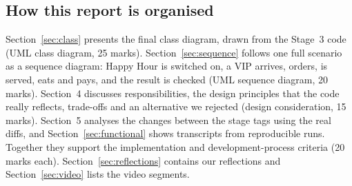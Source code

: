 \subsection*{How this report is organised}

Section~\ref{sec:class} presents the final class diagram, drawn from the Stage~3 code (UML class diagram, 25 marks). Section~\ref{sec:sequence} follows one full scenario as a sequence diagram: Happy Hour is switched on, a VIP arrives, orders, is served, eats and pays, and the result is checked (UML sequence diagram, 20 marks). Section~4 discusses responsibilities, the design principles that the code really reflects, trade-offs and an alternative we rejected (design consideration, 15 marks). Section~5 analyses the changes between the stage tags using the real diffs, and Section~\ref{sec:functional} shows transcripts from reproducible runs. Together they support the implementation and development-process criteria (20 marks each). Section~\ref{sec:reflections} contains our reflections and Section~\ref{sec:video} lists the video segments.
